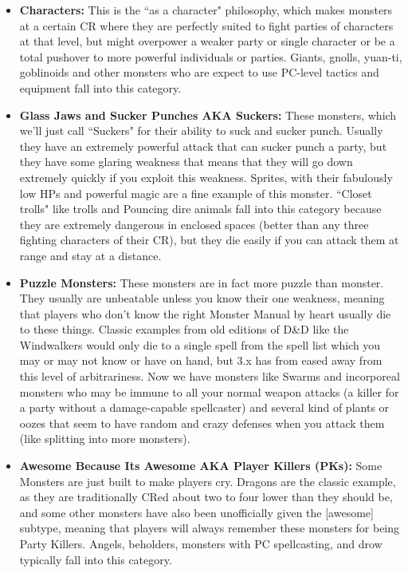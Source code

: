 \begin{itemize}\itemspace
   \item \textbf{Characters:} This is the ``as a character" philosophy, which makes monsters at a certain CR where they are perfectly suited to fight parties of characters at that level, but might overpower a weaker party or single character or be a total pushover to more powerful individuals or parties. Giants, gnolls, yuan-ti, goblinoids and other monsters who are expect to use PC-level tactics and equipment fall into this category.
   \item \textbf{Glass Jaws and Sucker Punches AKA Suckers:} These monsters, which we'll just call ``Suckers" for their ability to suck and sucker punch. Usually they have an extremely powerful attack that can sucker punch a party, but they have some glaring weakness that means that they will go down extremely quickly if you exploit this weakness. Sprites, with their fabulously low HPs and powerful magic are a fine example of this monster. ``Closet trolls" like trolls and Pouncing dire animals fall into this category because they are extremely dangerous in enclosed spaces (better than any three fighting characters of their CR), but they die easily if you can attack them at range and stay at a distance.
   \item \textbf{Puzzle Monsters:} These monsters are in fact more puzzle than monster. They usually are unbeatable unless you know their one weakness, meaning that players who don't know the right Monster Manual by heart usually die to these things. Classic examples from old editions of D\&D like the Windwalkers would only die to a single spell from the spell list which you may or may not know or have on hand, but 3.x has from eased away from this level of arbitrariness. Now we have monsters like Swarms and incorporeal monsters who may be immune to all your normal weapon attacks (a killer for a party without a damage-capable spellcaster) and several kind of plants or oozes that seem to have random and crazy defenses when you attack them (like splitting into more monsters).
   \item \textbf{Awesome Because Its Awesome AKA Player Killers (PKs):} Some Monsters are just built to make players cry. Dragons are the classic example, as they are traditionally CRed about two to four lower than they should be, and some other monsters have also been unofficially given the [awesome] subtype, meaning that players will always remember these monsters for being Party Killers. Angels, beholders, monsters with PC spellcasting, and drow typically fall into this category.
\end{itemize}


